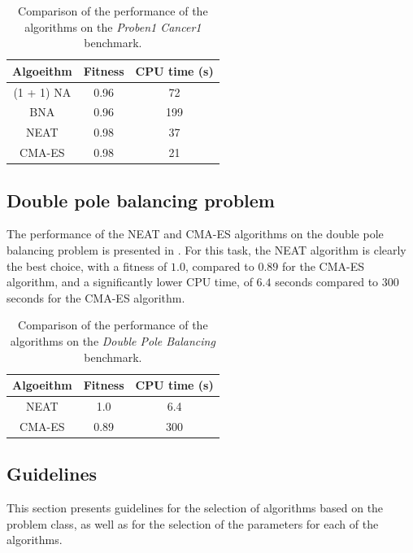 \begin{table}
    \caption{Comparison of the performance of the algorithms on the \textit{Proben1 Cancer1} benchmark.}
    \label{tab:comparison_proben1}
    \centering
    \begin{tabular}{ |c|c|c| }
        \hline
        Algoeithm & Fitness & CPU time (s) \\
        \hline
        (1 + 1) NA & 0.96 & 72 \\
        \hline
        BNA & 0.96 & 199 \\
        \hline
        NEAT & 0.98 & 37 \\
        \hline
        CMA-ES & 0.98 & 21 \\
        \hline\hline
    \end{tabular}
\end{table}

\subsection{Double pole balancing problem}

The performance of the NEAT and CMA-ES algorithms on the double pole balancing problem is presented in .
For this task, the NEAT algorithm is clearly the best choice, with a fitness of $1.0$, compared to $0.89$ for the CMA-ES algorithm, and a significantly lower CPU time, of $6.4$
seconds compared to $300$ seconds for the CMA-ES algorithm.

\begin{table}
    \caption{Comparison of the performance of the algorithms on the \textit{Double Pole Balancing} benchmark.}
    \label{tab:comparison_pole}
    \centering
    \begin{tabular}{ |c|c|c| }
        \hline
        Algoeithm & Fitness & CPU time (s) \\
        \hline
        NEAT & 1.0 & 6.4 \\
        \hline
        CMA-ES & 0.89 & 300 \\
        \hline\hline
    \end{tabular}
\end{table}

\subsection{Guidelines}

This section presents guidelines for the selection of algorithms based on the problem class, as well as for the selection of the parameters for each of the algorithms.

